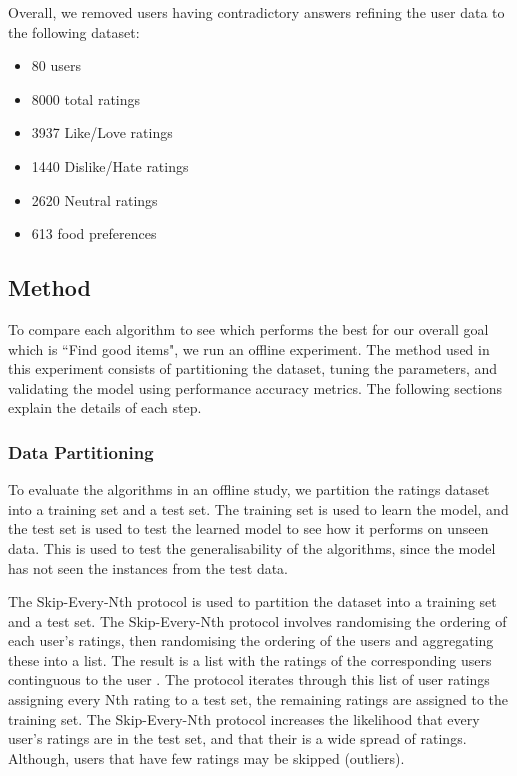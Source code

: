 Overall, we removed users having contradictory answers refining the user data to the following dataset:
\begin{itemize}
	\item{80 users}
	\item{8000 total ratings}
	\item{3937 Like/Love ratings}
	\item{1440 Dislike/Hate ratings}
    \item{2620 Neutral ratings}
	\item{613 food preferences}
\end{itemize}

\subsection{Method}

To compare each algorithm to see which performs the best for our overall goal which is ``Find good items", we run an offline experiment. The method used in this experiment consists of partitioning the dataset, tuning the parameters, and validating the model using performance accuracy metrics. The following sections explain the details of each step.

\subsubsection{Data Partitioning}

To evaluate the algorithms in an offline study, we partition the ratings dataset into a training set and a test set. The training set is used to learn the model, and the test set is used to test the learned model to see how it performs on unseen data. This is used to test the generalisability of the algorithms, since the model has not seen the instances from the test data. 

The Skip-Every-Nth protocol is used to partition the dataset into a training set and a test set. The Skip-Every-Nth protocol involves randomising the ordering of each user's ratings, then randomising the ordering of the users and aggregating these into a list. The result is a list with the ratings of the corresponding users continguous to the user . The protocol iterates through this list of user ratings assigning every Nth rating to a test set, the remaining ratings are assigned to the training set. The Skip-Every-Nth protocol increases the likelihood that every user's ratings are in the test set, and that their is a wide spread of ratings. Although, users that have few ratings may be skipped (outliers).

